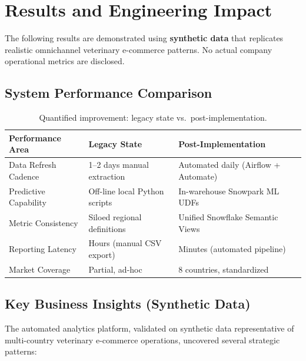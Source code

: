 \documentclass[11pt,a4paper]{article}
\begin{document}
\section{Results and Engineering Impact}

The following results are demonstrated using \textbf{synthetic data} that replicates realistic omnichannel veterinary e-commerce patterns. No actual company operational metrics are disclosed.

\subsection{System Performance Comparison}

\begin{table}[H]
\caption{Quantified improvement: legacy state vs.\ post-implementation.}
\setlength{\tabcolsep}{5pt}
\renewcommand{\arraystretch}{1.4}
\begin{tabular}{l l l}
\toprule
\textbf{Performance Area} & \textbf{Legacy State} & \textbf{Post-Implementation} \\
\midrule
Data Refresh Cadence & 1--2 days manual extraction & Automated daily (Airflow + Automate) \\
Predictive Capability & Off-line local Python scripts & In-warehouse Snowpark ML UDFs \\
Metric Consistency & Siloed regional definitions & Unified Snowflake Semantic Views \\
Reporting Latency & Hours (manual CSV export) & Minutes (automated pipeline) \\
Market Coverage & Partial, ad-hoc & 8 countries, standardized \\
\bottomrule
\end{tabular}
\end{table}

\subsection{Key Business Insights (Synthetic Data)}

The automated analytics platform, validated on synthetic data representative of multi-country veterinary e-commerce operations, uncovered several strategic patterns:
\end{document}
